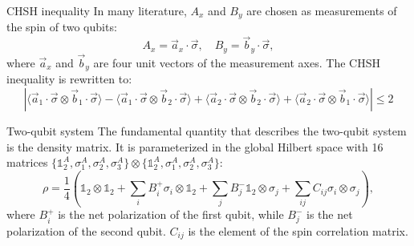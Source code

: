 \documentclass{beamer}
\begin{document}
    \begin{frame}{CHSH inequality}
        In many literature, $A_x$ and $B_y$ are chosen as measurements of the spin of two qubits: 
        \begin{equation*}
            A_x = \vec{a}_x\cdot \vec{\sigma}, \quad B_y = \vec{b}_y\cdot \vec{\sigma}, 
        \end{equation*}
        where $\vec{a}_x$ and $\vec{b}_y$ are four unit vectors of the measurement axes. The CHSH inequality is rewritten to: 
        \begin{equation*}
            |\langle \vec{a}_1\cdot \vec{\sigma}\otimes \vec{b}_1\cdot \vec{\sigma}\rangle - \langle \vec{a}_1\cdot \vec{\sigma}\otimes \vec{b}_2\cdot \vec{\sigma}\rangle + \langle \vec{a}_2\cdot \vec{\sigma}\otimes \vec{b}_2\cdot \vec{\sigma}\rangle + \langle \vec{a}_2\cdot \vec{\sigma}\otimes \vec{b}_1\cdot \vec{\sigma}\rangle| \leq 2
        \end{equation*}        
    \end{frame}

    \begin{frame}{Two-qubit system}
        The fundamental quantity that describes the two-qubit system is the density matrix. It is parameterized in the global Hilbert space with 16 matrices $\{\mathbb{1}_2^A,\sigma^A_1, \sigma^A_2, \sigma^A_3\}\otimes\{\mathbb{1}_2^A,\sigma^A_1, \sigma^A_2, \sigma^A_3\}$: 
        \begin{equation*}
            \rho = \frac{1}{4}\left(\mathbb{1}_2\otimes\mathbb{1}_2 + \sum_iB_i^+\sigma_i\otimes\mathbb{1}_2+\sum_jB^-_j\mathbb{1}_2\otimes\sigma_j +\sum_{ij}C_{ij}\sigma_i\otimes\sigma_j\right),
        \end{equation*}
        where $B^+_i$ is the net polarization of the first qubit, while $B^-_j$ is the net polarization of the second qubit. $C_{ij}$ is the element of the spin correlation matrix.
        \begin{center}
            \footnotesize {}
        \end{center}
    \end{frame}
\end{document}
